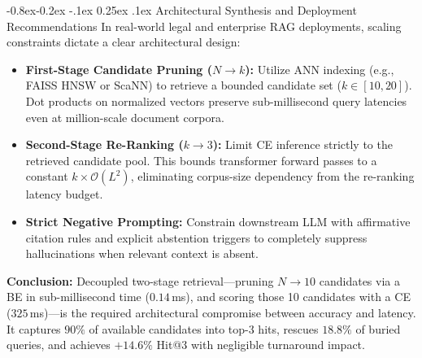 \documentclass[11pt,a4paper]{article}
\makeatletter
\renewcommand\subsection{\@startsection{subsection}{2}{\z@}%
  {-0.8ex\@plus -0.2ex \@minus -.1ex}%
  {0.25ex \@plus .1ex}%
  {\normalfont\normalsize\bfseries\color{primaryblue}}}
\makeatother
\begin{document}
\subsection{Architectural Synthesis and Deployment Recommendations}
In real-world legal and enterprise RAG deployments, scaling constraints dictate a clear architectural design:
\begin{itemize}
  \setlength{\itemsep}{0.5pt}\setlength{\parskip}{0pt}
  \item \textbf{First-Stage Candidate Pruning ($N \rightarrow k$):} Utilize ANN indexing (e.g., FAISS HNSW or ScaNN) to retrieve a bounded candidate set ($k \in [10, 20]$). Dot products on normalized vectors preserve sub-millisecond query latencies even at million-scale document corpora.
  \item \textbf{Second-Stage Re-Ranking ($k \rightarrow 3$):} Limit CE inference strictly to the retrieved candidate pool. This bounds transformer forward passes to a constant $k \times \mathcal{O}(L^2)$, eliminating corpus-size dependency from the re-ranking latency budget.
  \item \textbf{Strict Negative Prompting:} Constrain downstream LLM with affirmative citation rules and explicit abstention triggers to completely suppress hallucinations when relevant context is absent.
\end{itemize}

\textbf{Conclusion:} Decoupled two-stage retrieval---pruning $N \rightarrow 10$ candidates via a BE in sub-millisecond time ($0.14$\,ms), and scoring those 10 candidates with a CE ($325$\,ms)---is the required architectural compromise between accuracy and latency. It captures $90\%$ of available candidates into top-3 hits, rescues $18.8\%$ of buried queries, and achieves $+14.6\%$ Hit@3 with negligible turnaround impact.
\end{document}
